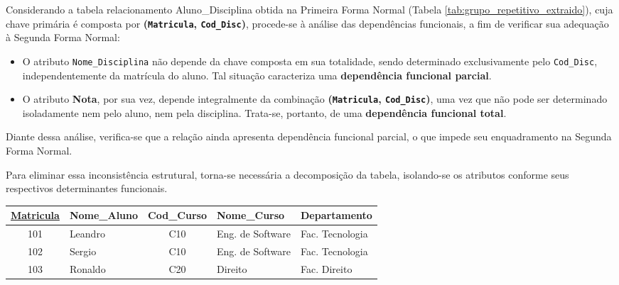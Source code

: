 \begin{tcolorbox}[breakable, colback=blue!5,colframe=blue!40!black,title=Situação exemplo]

Considerando a tabela relacionamento Aluno\_Disciplina obtida na Primeira Forma Normal (Tabela \ref{tab:grupo_repetitivo_extraido}), cuja chave primária é composta por \textbf{(\texttt{Matricula}, \texttt{Cod\_Disc})}, procede-se à análise das dependências funcionais, a fim de verificar sua adequação à Segunda Forma Normal:

\begin{itemize}
    \item O atributo \texttt{Nome\_Disciplina} não depende da chave composta em sua totalidade, sendo determinado exclusivamente pelo \texttt{Cod\_Disc}, independentemente da matrícula do aluno. Tal situação caracteriza uma \textbf{dependência funcional parcial}.

    \item O atributo \textbf{Nota}, por sua vez, depende integralmente da combinação \textbf{(\texttt{Matricula}, \texttt{Cod\_Disc})}, uma vez que não pode ser determinado isoladamente nem pelo aluno, nem pela disciplina. Trata-se, portanto, de uma \textbf{dependência funcional total}.
\end{itemize}

\vspace{0.4cm}

Diante dessa análise, verifica-se que a relação ainda apresenta dependência funcional parcial, o que impede seu enquadramento na Segunda Forma Normal.

Para eliminar essa inconsistência estrutural, torna-se necessária a decomposição da tabela, isolando-se os atributos conforme seus respectivos determinantes funcionais.

\vspace{0.5cm}

\centering
\renewcommand{\arraystretch}{1.2}

\begin{adjustbox}{max width=\textwidth}
\begin{tabular}{|c|l|c|l|l|}
\hline
\textbf{\underline{Matricula}} & \textbf{Nome\_Aluno} & \textbf{Cod\_Curso} & \textbf{Nome\_Curso} & \textbf{Departamento} \\ \hline
101 & Leandro & C10 & Eng. de Software & Fac. Tecnologia \\ \hline
102 & Sergio & C10 & Eng. de Software & Fac. Tecnologia \\ \hline
103 & Ronaldo & C20 & Direito & Fac. Direito \\ \hline
\end{tabular}
\end{adjustbox}
\vspace{0.3cm}
\label{tab:2fn_aluno_curso}


\end{tcolorbox}
